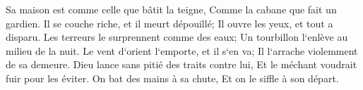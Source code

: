 \verse Sa maison est comme celle que bâtit la teigne, Comme la cabane que fait un gardien. 
\verse Il se couche riche, et il meurt dépouillé; Il ouvre les yeux, et tout a disparu. 
\verse Les terreurs le surprennent comme des eaux; Un tourbillon l`enlève au milieu de la nuit. 
\verse Le vent d`orient l`emporte, et il s`en va; Il l`arrache violemment de sa demeure. 
\verse Dieu lance sans pitié des traits contre lui, Et le méchant voudrait fuir pour les éviter. 
\verse On bat des mains à sa chute, Et on le siffle à son départ. 

